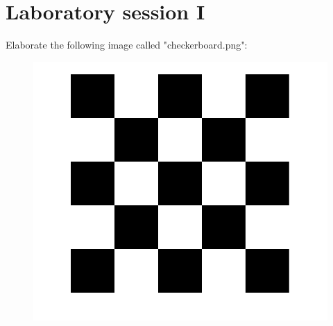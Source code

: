 \documentclass[12pt, a4paper]{report}
\newtheorem[style=M,bodystyle=\normalfont]{theorem}{Theorem}
\newtheorem[style=M,bodystyle=\normalfont]{corollary}{Corollary}
\newtheorem[style=M,bodystyle=\normalfont]{lemma}{Lemma}
\newtheorem[style=M,bodystyle=\normalfont]{definition}{Definition}
\begin{document}
    \newpage

\chapter{Laboratory session I}
\begin{Exercise}[label=1]
    Elaborate the following image called "checkerboard.png": 
    \begin{figure}[H]
        \centering
        \includegraphics[width=0.5\linewidth]{images/checkerboard.png}
    \end{figure}
\end{Exercise}
\end{document}
